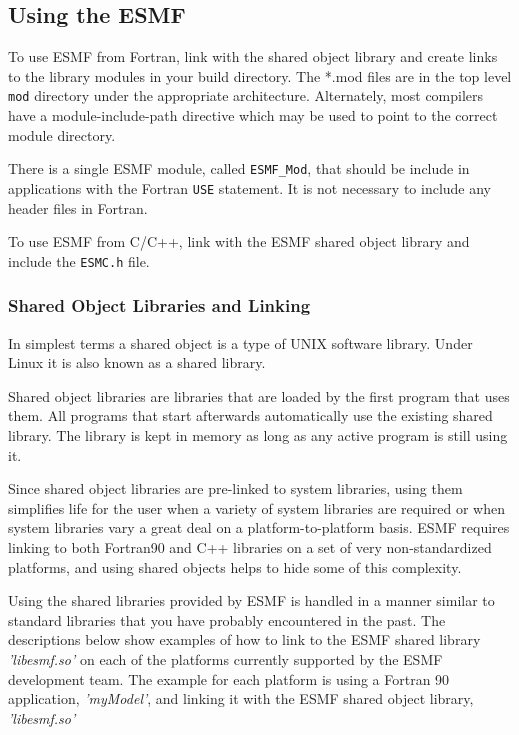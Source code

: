 
\subsection{Using the ESMF}
\label{UsingLibrary}

To use ESMF from Fortran, link with the shared object library and
create links to the library modules in your build directory.  The
*.mod files are
in the top level {\tt mod} directory under the appropriate architecture.  
Alternately, most compilers have a module-include-path directive which 
may be used to point to the correct module directory.

There is a single ESMF module, called {\tt ESMF\_Mod}, that should be 
include in applications with the Fortran {\tt USE} statement.  It 
is not necessary to include any header files in Fortran.

To use ESMF from C/C++, link with the ESMF shared object library 
and include the {\tt ESMC.h} file.

\subsubsection{Shared Object Libraries and Linking}

In simplest terms a shared object is a type of UNIX software library. 
Under Linux it is also known as a shared library. 

Shared object libraries are libraries that are loaded by the first program that uses them. All programs that start afterwards automatically use the existing shared library. The library is kept in memory as long as any active program is still using it. 

Since shared object libraries are pre-linked to system libraries, using them
simplifies life for the user when a variety of system libraries are
required or when system libraries vary a great deal on a 
platform-to-platform basis.  ESMF requires linking to both Fortran90 and
C++ libraries on a set of very non-standardized platforms, and using
shared objects helps to hide some of this complexity.

Using the shared libraries provided by ESMF is handled in a manner similar to standard libraries that you have probably encountered in the past. The descriptions below show examples of how to link to the ESMF shared library \emph{'libesmf.so'} on each of the platforms currently supported by the ESMF development team. The example for each platform is using a Fortran 90 application, \emph{'myModel'}, and linking it with the ESMF shared object library, \emph{'libesmf.so'}

